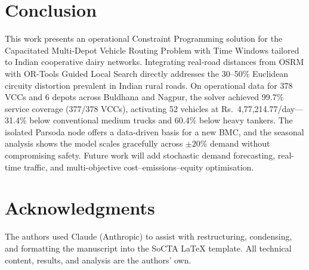 \documentclass{svproc}
\begin{document}
\section{Conclusion}
\label{sec4}

This work presents an operational Constraint Programming solution for the Capacitated Multi-Depot Vehicle Routing Problem with Time Windows tailored to Indian cooperative dairy networks. Integrating real-road distances from OSRM with OR-Tools Guided Local Search directly addresses the 30--50\% Euclidean circuity distortion prevalent in Indian rural roads. On operational data for 378 VCCs and 6 depots across Buldhana and Nagpur, the solver achieved 99.7\% service coverage (377/378 VCCs), activating 52 vehicles at Rs.~4,77,214.77/day---31.4\% below conventional medium trucks and 60.4\% below heavy tankers. The isolated Parsoda node offers a data-driven basis for a new BMC, and the seasonal analysis shows the model scales gracefully across $\pm20\%$ demand without compromising safety. Future work will add stochastic demand forecasting, real-time traffic, and multi-objective cost--emissions--equity optimisation.

\section*{Acknowledgments}
The authors used Claude (Anthropic) to assist with restructuring, condensing, and formatting the manuscript into the SoCTA LaTeX template. All technical content, results, and analysis are the authors' own.



\end{document}
